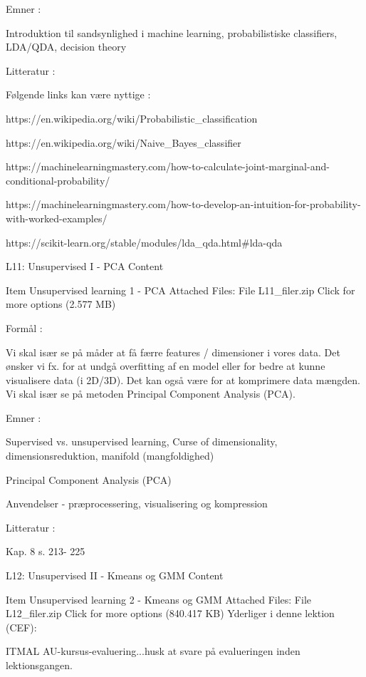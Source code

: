     Emner :

    Introduktion til sandsynlighed i machine learning, probabilistiske classifiers, LDA/QDA, decision theory


    Litteratur :

    Følgende links kan være nyttige :

    https://en.wikipedia.org/wiki/Probabilistic_classification

    https://en.wikipedia.org/wiki/Naive_Bayes_classifier

    https://machinelearningmastery.com/how-to-calculate-joint-marginal-and-conditional-probability/

    https://machinelearningmastery.com/how-to-develop-an-intuition-for-probability-with-worked-examples/

    https://scikit-learn.org/stable/modules/lda_qda.html#lda-qda 




     
     
 L11: Unsupervised I - PCA
Content

    Item
    Unsupervised learning 1 - PCA
    Attached Files:
        File L11_filer.zip Click for more options (2.577 MB) 

    Formål :

    Vi skal især se på måder at få færre features / dimensioner i vores data. Det ønsker vi fx. for at undgå overfitting af en model eller for bedre at kunne visualisere data (i 2D/3D). Det kan også være for at komprimere data mængden. Vi skal især se på metoden Principal Component Analysis (PCA).

    Emner :

    Supervised vs. unsupervised learning, Curse of dimensionality, dimensionsreduktion, manifold (mangfoldighed)

    Principal Component Analysis (PCA)

    Anvendelser - præprocessering, visualisering og kompression


    Litteratur :

    Kap. 8  s. 213- 225


 L12: Unsupervised II - Kmeans og GMM
Content

    Item
    Unsupervised learning 2 - Kmeans og GMM
    Attached Files:
        File L12_filer.zip Click for more options (840.417 KB) 
    Yderliger i denne lektion (CEF):

    ITMAL AU-kursus-evaluering...husk at svare på evalueringen inden lektionsgangen.


